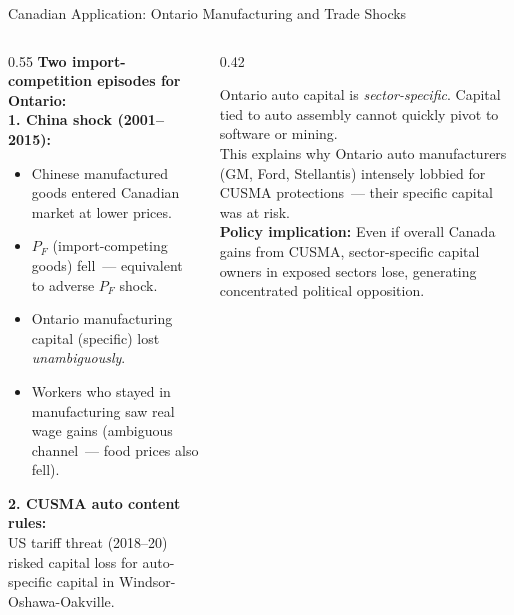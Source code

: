 \documentclass[aspectratio=169]{beamer}
\begin{document}
\begin{frame}{Canadian Application: Ontario Manufacturing and Trade Shocks}
\begin{columns}[T]
\begin{column}{0.55\textwidth}
\textbf{Two import-competition episodes for Ontario:}\\[0.3em]
\textbf{1. China shock (2001--2015):}
\begin{itemize}\small
  \item Chinese manufactured goods entered Canadian market
        at lower prices.
  \item $P_F$ (import-competing goods) fell~---
        equivalent to adverse $P_F$ shock.
  \item Ontario manufacturing capital (specific) lost
        \emph{unambiguously}.
  \item Workers who stayed in manufacturing saw real
        wage gains (ambiguous channel~--- food prices
        also fell).
\end{itemize}
\vspace{0.2em}
\textbf{2. CUSMA auto content rules:}\\
US tariff threat (2018--20) risked capital loss for
auto-specific capital in Windsor-Oshawa-Oakville.
\end{column}
\begin{column}{0.42\textwidth}
\begin{canadex}
\footnotesize Ontario auto capital is \emph{sector-specific}.
Capital tied to auto assembly cannot quickly pivot to
software or mining.\\[0.2em]
This explains why Ontario auto manufacturers (GM,
Ford, Stellantis) intensely lobbied for CUSMA
protections~--- their specific capital was at risk.\\[0.2em]
\textbf{Policy implication:} Even if overall Canada
gains from CUSMA, sector-specific capital owners in
exposed sectors lose, generating concentrated political
opposition.
\end{canadex}
\end{column}
\end{columns}
\end{frame}
\end{document}
